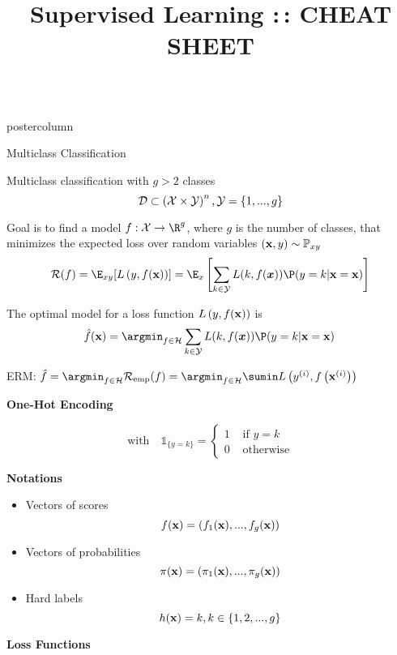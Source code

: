 \documentclass{beamer}
\title{Supervised Learning :\,: CHEAT SHEET} %
\newlength{\columnheight} %
\begin{document}
\begin{frame}[fragile]{}
\begin{columns}
	\begin{column}{.31\textwidth}
		\begin{beamercolorbox}[center]{postercolumn}
			\begin{minipage}{.98\textwidth}
				\parbox[t][\columnheight]{\textwidth}{

					\begin{myblock}{Multiclass Classification}

      Multiclass classification with $g > 2$ classes
$$\mathcal{D} \subset \left(\mathcal{X} \times \mathcal{Y}\right)^n, \mathcal{Y} = \{1, ..., g\}$$ 

Goal is to find a model  $f: \Xspace \to \R^g$, where $g$ is the number of classes, that minimizes the expected loss over random variables $(\mathbf{x}, y) \sim \mathbb{P}_{xy}$ 
$$
 \riskf = \E_{xy}[\Lxy] = \E_{x}\left[\sum_{k \in \Yspace} L(k, f(\bm{x})) \P(y = k| \xv = \xv)\right] 
$$

The optimal model for a loss function $L\left(y, f(\mathbf{x})\right)$ is
$$ \fxh = \argmin_{f \in \Hspace} \sum_{k \in \Yspace} L(k, f(\bm{x})) \P(y = k| \xv = \xv)\, $$

ERM: $\fh = \argmin_{f \in \Hspace} \riske(f) = \argmin_{f \in \Hspace} \sumin \Lxyi$

\begin{codebox} 
  \textbf{One-Hot Encoding}
  \end{codebox}
$$
\text{with}\quad \mathds{1}_{\{y = k\}} = \begin{cases} 1 & \text{ if } y = k \\
0 & \text{ otherwise}\end{cases}
$$

\begin{codebox} 
  \textbf{Notations}
  \end{codebox}
\begin{itemize}[$\bullet$] 
  \setlength{\itemindent}{+.3in}
    \item Vectors of scores $$f(\mathbf{x}) = \left(f_1(\mathbf{x}), ..., f_g(\mathbf{x})\right)$$
    \item Vectors of probabilities $$\pi(\mathbf{x}) = \left(\pi_1(\mathbf{x}), ..., \pi_g(\mathbf{x})\right)$$
    \item Hard labels $$h(\mathbf{x}) = k, k \in \{1, 2, ..., g\}$$
\end{itemize}

\begin{codebox} 
  \textbf{Loss Functions}
  \end{codebox}


\end{myblock}}
\end{minipage}
\end{beamercolorbox}
\end{column}
\end{columns}
\end{frame}
\end{document}

